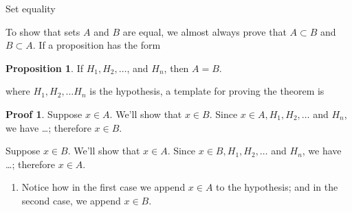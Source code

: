 \documentclass[fleqn]{beamer}
\theoremstyle{definition}
\newtheorem{myth}{Proposition}
\newtheorem{myproof}{Proof}
\begin{document}
\begin{frame}{Set equality}

To show that sets \(A\) and \(B\) are equal, we almost always prove that \(A \subset B\) and \(B \subset A\).  If a proposition has the form

\begin{myth} If \(H_1, H_2, \dots\), and \( H_n\), then \(A = B\). \end{myth}

where  \(H_1, H_2, \dots H_n\) is the hypothesis, a template for proving the theorem is
\begin{myproof} Suppose \(x \in A\).  We'll show that \(x \in B\).  Since  \(x \in A, H_1, H_2, \dots\) and \( H_n\),  we have \dots; therefore \(x \in B\).

\quad Suppose \(x \in B\).  We'll show that \(x \in A\).  Since  \(x \in B, H_1, H_2, \dots\) and  \(H_n\),  we have \dots; therefore \(x \in A\).

\end{myproof}

\begin{enumerate}

\item Notice how in the first case we append \(x \in A\) to the hypothesis; and in the second case, we append \(x \in B\).
\end{enumerate}

\end{frame}
\end{document}
